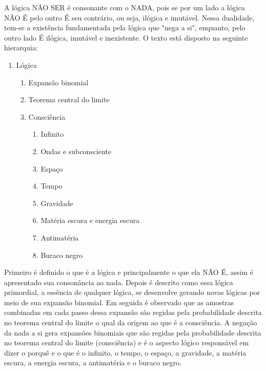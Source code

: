 A lógica NÃO SER é consonante com o NADA, pois se por um lado a lógica NÃO É pelo outro É seu contrário, ou seja, ilógica e imutável. Nessa dualidade, tem-se a existência
fundamentada pela lógica que "nega a si", enquanto, pelo outro lado É ilógica, imutável e
inexistente. O texto está disposto na seguinte hierarquia:
{\small
\begin{enumerate}[label*=\arabic*.]
   \item Lógica
   \begin{enumerate}[label*=\arabic*.]
	   \item Expansão binomial
	   \item Teorema central do limite
	   \item Consciência
		   \begin{enumerate}[label*=\arabic*.]
			   \item Infinito
			   \item Ondas e subconsciente
			   \item Espaço
			   \item Tempo
			   \item Gravidade
			   \item Matéria escura e energia escura
			   \item Antimatéria
			   \item Buraco negro
		   \end{enumerate}   
   \end{enumerate}
\end{enumerate}
}
Primeiro é definido o que é a lógica e principalmente o que ela NÃO É, assim é apresentado sua consonância ao nada. Depois é descrito como essa lógica primordial, a essência de qualquer lógica, se desenvolve gerando novas lógicas por meio de sua expansão binomial. Em seguida é observado que as amostras combinadas em cada passo dessa expansão são regidas pela probabilidade descrita no teorema central do limite o qual da origem ao que é a consciência. A negação da nada a si gera expansões binomiais que são regidas pela probabilidade descrita no teorema central do limite (consciência) e é o aspecto lógico responsável em dizer o porquê e o que é o infinito, o tempo, o espaço, a gravidade, a matéria escura, a energia escura, a antimatéria e o buraco negro. 